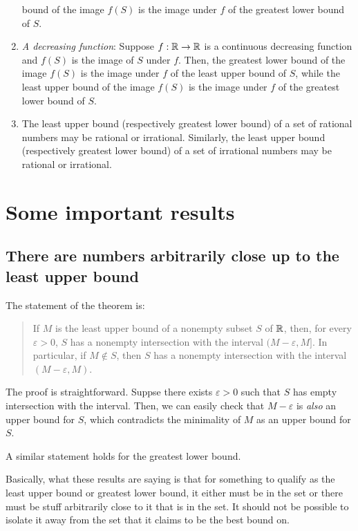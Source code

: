 \documentclass{amsart}
\begin{document}
\begin{enumerate}
  bound of the image $f(S)$ is the image under $f$ of the greatest
  lower bound of $S$.
\item {\em A decreasing function}: Suppose $f: \mathbb{R} \to \mathbb{R}$ is a
  continuous decreasing function and $f(S)$ is the image of $S$ under
  $f$. Then, the greatest lower bound of the image $f(S)$ is the image
  under $f$ of the least upper bound of $S$, while the least upper
  bound of the image $f(S)$ is the image under $f$ of the greatest
  lower bound of $S$.
\item The least upper bound (respectively greatest lower bound) of a
  set of rational numbers may be rational or irrational. Similarly,
  the least upper bound (respectively greatest lower bound) of a set
  of irrational numbers may be rational or irrational.
\end{enumerate}

\section{Some important results}

\subsection{There are numbers arbitrarily close up to the least upper bound}

The statement of the theorem is:

\begin{quote}
  If $M$ is the least upper bound of a nonempty subset $S$ of $\mathbb{R}$,
  then, for every $\varepsilon > 0$, $S$ has a nonempty intersection with
  the interval $(M - \varepsilon,M]$. In particular, if $M \notin S$,
  then $S$ has a nonempty intersection with the interval $(M -
  \varepsilon, M)$.
\end{quote}

The proof is straightforward. Suppse there exists $\varepsilon > 0$ such
that $S$ has empty intersection with the interval. Then, we can easily
check that $M - \varepsilon$ is {\em also} an upper bound for $S$, which
contradicts the minimality of $M$ as an upper bound for $S$.

A similar statement holds for the greatest lower bound.

Basically, what these results are saying is that for something to
qualify as the least upper bound or greatest lower bound, it either
must be in the set or there must be stuff arbitrarily close to it that
is in the set. It should not be possible to isolate it away from the
set that it claims to be the best bound on.
\end{document}

